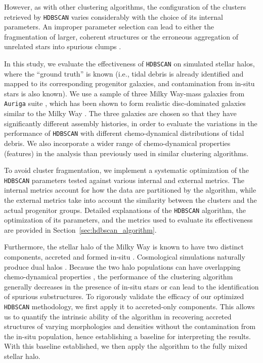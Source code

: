 However, as with other clustering algorithms, the configuration of the clusters retrieved by \texttt{HDBSCAN} varies considerably with the choice of its internal parameters. An improper parameter selection can lead to either the fragmentation of larger, coherent structures or the erroneous aggregation of unrelated stars into spurious clumps \citep{Kim2025}. 

In this study, we evaluate the effectiveness of \texttt{HDBSCAN} on simulated stellar halos, where the ``ground truth'' is known (i.e., tidal debris is already identified and mapped to its corresponding progenitor galaxies, and contamination from in-situ stars is also known). We use a sample of three Milky Way-mass galaxies from \texttt{Auriga} suite \citep{Grand2017,Grand2024a}, which has been shown to form realistic disc-dominated galaxies similar to the Milky Way \citep{Grand2017,Orkney2022}. The three galaxies are chosen so that they have significantly different assembly histories, in order to evaluate the variations in the performance of \texttt{HDBSCAN} with different chemo-dynamical distributions of tidal debris. We also incorporate a wider range of chemo-dynamical properties (features) in the analysis than previously used in similar clustering algorithms.

To avoid cluster fragmentation, we implement a systematic optimization of the \texttt{HDBSCAN} parameters tested against various internal and external metrics. The internal metrics account for how the data are partitioned by the algorithm, while the external metrics take into account the similarity between the clusters and the actual progenitor groups. Detailed explanations of the \texttt{HDBSCAN} algorithm, the optimization of its parameters, and the metrics used to evaluate its effectiveness are provided in Section~\ref{sec:hdbscan_algorithm}.

Furthermore, the stellar halo of the Milky Way is known to have two distinct components, accreted and formed in-situ \citep{Carollo2007,Beers2012,Belokurov2022}. Cosmological simulations naturally produce dual halos \citep{Zolotov2009,Font2011,McCarthy2012,Tissera2013,Cooper2015}. Because the two halo populations can have overlapping chemo-dynamical properties \citep{Haywood2018,DiMatteo2019,Mori2024}, the performance of the clustering algorithm generally decreases in the presence of in-situ stars or can lead to the identification of spurious substructures. To rigorously validate the efficacy of our optimized \texttt{HDBSCAN} methodology, we first apply it to accreted-only components. This allows us to quantify the intrinsic ability of the algorithm in recovering accreted structures of varying morphologies and densities without the contamination from the in-situ population, hence establishing a baseline for interpreting the results. With this baseline established, we then apply the algorithm to the fully mixed stellar halo.  


